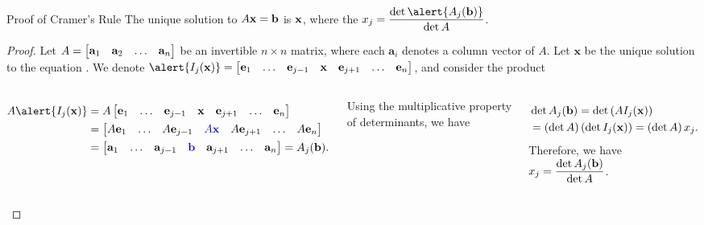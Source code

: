 \documentclass[xcolor=dvipsnames,aspectratio=169,t]{beamer}
\begin{document}
\begin{frame}{Proof of Cramer's Rule}
  \bbox
  The unique solution to $A\mathbf{x}=\mathbf{b}$ is $\mathbf{x}$, where the  $\displaystyle x_j = \frac{\det \alert{ A_j(\b)}}{\det A}$.
  \ebox

  \pause
  {\small
  \begin{proof}
  Let $\displaystyle A = \begin{bmatrix} \mathbf{a}_1 &  \mathbf{a}_2  & \ldots &  \mathbf{a}_n \end{bmatrix}$ be an invertible $n \times n$ matrix, where each $\mathbf{a}_i$ denotes a column vector of $A$. Let $\mathbf{x}$ be the unique solution to the equation . We denote
  $\dsty \alert{I_j(\mathbf{x})} = \begin{bmatrix} \mathbf{e}_1 & \ldots &  \mathbf{e}_{j-1}  & \mathbf{x} & \mathbf{e}_{j+1} & \ldots & \mathbf{e}_n \end{bmatrix}$,
  and consider the product

  \begin{columns}[T]

  \column{0.65\tw}

  \begin{align*}
  A \alert{I_j(\x)} &= A  \begin{bmatrix} \mathbf{e}_1 & \ldots &  \mathbf{e}_{j-1}  & \x & \mathbf{e}_{j+1} & \ldots & \mathbf{e}_n \end{bmatrix} \\
  &= \begin{bmatrix} A\mathbf{e}_1 & \ldots &  A\mathbf{e}_{j-1}  & \colorb{A\x} & A\mathbf{e}_{j+1} & \ldots & A\mathbf{e}_n \end{bmatrix} \\
  &=  \begin{bmatrix} \a_1 &  \ldots & \a_{j-1} &  \colorb{\b}  & \a_{j+1} & \ldots &  \a_n \end{bmatrix} = A_j (\b).
  \end{align*}
  
  \pause
  Using the multiplicative property of determinants, we have

  \column{0.35\tw}

  \begin{align*}
  & \det A_j ( \mathbf{b} )  = \det \left( A I_j(\mathbf{x}) \right)\\
  &= \left( \det A \right) \left( \det I_j(\mathbf{x}) \right) = \left( \det A \right) x_j.
  \end{align*}
  Therefore, we have $\displaystyle x_j = \frac{ \det A_j ( \mathbf{b} )}{\det A}$.
  \end{columns}

  \end{proof}}
\end{frame}
\end{document}
